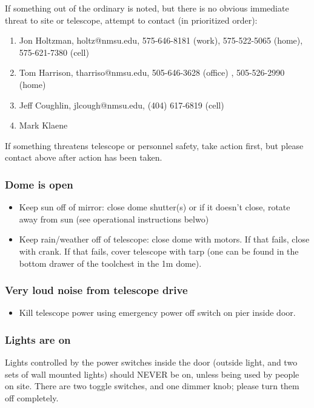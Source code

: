 \documentclass{article}
\begin{document}
If something out of the ordinary is noted, but there is no obvious
immediate threat to site or telescope, attempt to contact (in prioritized
order):
\begin{enumerate}
\item Jon Holtzman, holtz@nmsu.edu, 575-646-8181 (work), 
575-522-5065 (home), 575-621-7380 (cell)
\item Tom Harrison, tharriso@nmsu.edu, 505-646-3628 (office) , 505-526-2990 (home)
\item Jeff Coughlin, jlcough@nmsu.edu, (404) 617-6819 (cell)
\item Mark Klaene

\end{enumerate}

If something threatens telescope or personnel safety, take action first, but
please contact above after action has been taken.

\subsubsection{Dome is open}

\begin{itemize}
  \item Keep sun off of mirror: close dome shutter(s) or if it doesn't close, 
rotate away from sun (see operational instructions belwo)
  \item Keep rain/weather off of telescope: close dome with motors. If that
fails, close with crank. If that fails, cover telescope with tarp (one can
be found in the bottom drawer of the toolchest in the 1m dome).
\end{itemize}

\subsubsection{Very loud noise from telescope drive}

\begin{itemize}
  \item Kill telescope power using emergency power off switch on pier inside
door.
\end{itemize}

\subsubsection{Lights are on}

Lights controlled by the power switches inside the door (outside light, and
two sets of wall mounted lights) should NEVER be on, unless being used by
people on site. There are two toggle switches, and one dimmer knob; please
turn them off completely.
\end{document}

